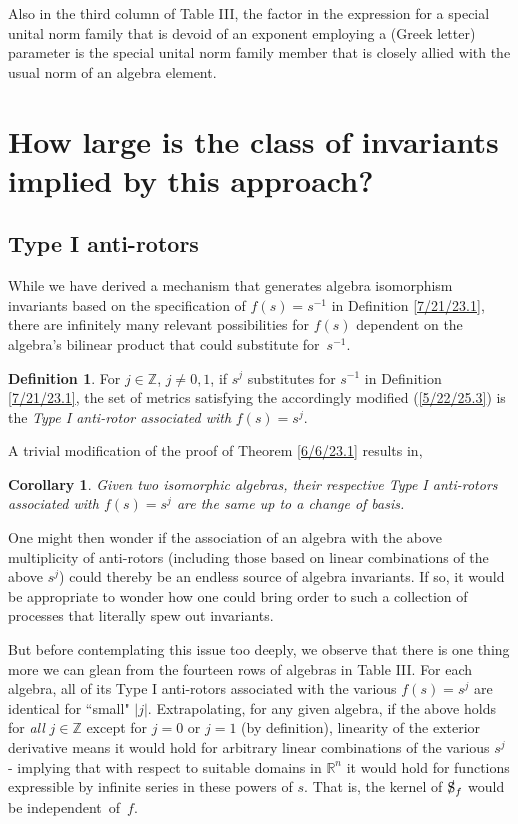 \documentclass{amsart}
\newtheorem{corollary}[theorem]{Corollary}
\theoremstyle{definition}
\newtheorem{definition}[theorem]{Definition}
\numberwithin{theorem}{section}
\numberwithin{equation}{section}
\begin{document}
Also in the third column of Table III, the factor in the expression for a special unital norm family that is devoid of an exponent employing a (Greek letter) parameter is the special unital norm family member that is closely allied with the usual norm of an algebra element.

\section{How large is the class of invariants implied by this approach?}

\subsection{Type I anti-rotors}
While we have derived a mechanism that generates \mbox{algebra} isomorphism invariants based on the specification of $f(s)=s^{-1}$ in Definition  
\ref{7/21/23.1}, there are infinitely many relevant possibilities for $f(s)$ dependent on the algebra's bilinear product that could substitute \mbox{for $s^{-1}$}.

\begin{definition}\label{10/29/25.1}  For $j\in\mathbb{Z}$, $j\ne 0,1$, if $s^j$ substitutes for $s^{-1}$ in Definition  
\ref{7/21/23.1}, the set of metrics satisfying the accordingly modified (\ref{5/22/25.3}) is the {\it Type I anti-rotor associated with} $f(s)=s^j$. \end{definition}

A trivial modification of the proof of Theorem \ref{6/6/23.1} results in,

\begin{corollary}\label{10/29/25.2} Given two isomorphic algebras, their respective Type I anti-rotors associated with $f(s)=s^{j}$ are the same up to a change of basis. \end{corollary} 

 One might then wonder if the association of an algebra with the above multiplicity of anti-rotors (including those based on linear combinations of the above $s^j$) could thereby be an endless source of algebra invariants.  If so, it would be appropriate to wonder how one could bring order to such a collection of processes that literally spew out invariants.    

But before contemplating this issue too deeply, we observe that
there is one thing more we can glean from the fourteen rows of algebras in Table III.  For each algebra, all of its Type I anti-rotors associated with the various $f(s)=s^j$ are identical for ``small" $|j|$.  Extrapolating, for any given algebra, if the above holds for {\it all} $j\in\mathbb{Z}$ except for $j= 0$ or $j=1$ (by definition), linearity of the exterior derivative means it would hold for arbitrary linear combinations of the various $s^j$ - implying that with respect to suitable domains in $\mathbb{R}^n$ it would hold for functions expressible by infinite series in these powers of $s$.  That is, the kernel of $\slashed{\text{S}}_f$ would be \mbox{independent of $f$}.
\end{document}
